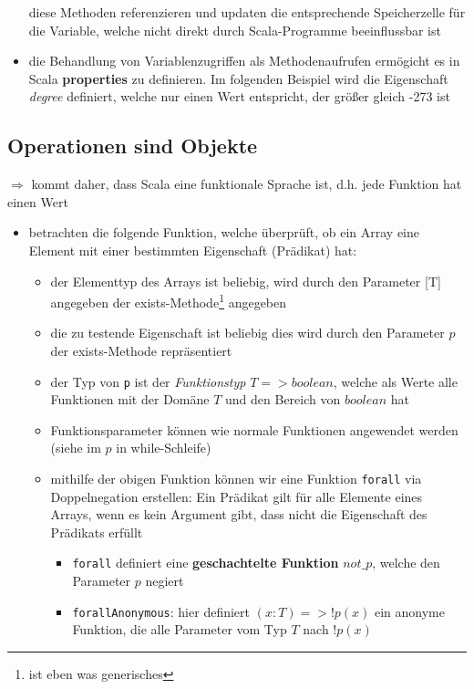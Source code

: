\begin{itemize}
  
  
  diese Methoden referenzieren und updaten die entsprechende Speicherzelle für
  die Variable, welche nicht direkt durch Scala-Programme beeinflussbar ist
  
  \item die Behandlung von Variablenzugriffen als Methodenaufrufen ermögicht
  es in Scala \textbf{properties} zu definieren. Im folgenden Beispiel wird
  die Eigenschaft \textit{degree} definiert, welche nur einen Wert entspricht,
  der größer \oder gleich -273 ist
  
  
  
\end{itemize}


\subsection{Operationen sind Objekte}
$\Rightarrow$ kommt daher, dass Scala eine funktionale Sprache ist, d.h. 
jede Funktion hat einen Wert




\begin{itemize}
  \item betrachten die folgende Funktion, welche überprüft, ob ein Array eine
  Element mit einer bestimmten Eigenschaft (Prädikat) hat:
  
  
  
  \begin{itemize}
    \item der Elementtyp des Arrays ist beliebig, wird durch den Parameter [T]
    angegeben der exists-Methode\footnote{ist eben was generisches} angegeben 
    \item die zu testende Eigenschaft ist beliebig \und dies wird durch
    den Parameter $p$ der exists-Methode repräsentiert
    \item der Typ von \texttt{p} ist der \textit{Funktionstyp} $T => boolean$,
    welche als Werte alle Funktionen mit der Domäne $T$ und den Bereich von
    $boolean$ hat
    \item Funktionsparameter können wie normale Funktionen angewendet werden 
    (siehe im $p$ in while-Schleife)
    \item mithilfe der obigen Funktion können wir eine Funktion \texttt{forall}
  via Doppelnegation erstellen: Ein Prädikat gilt für alle Elemente eines Arrays,
  wenn es kein Argument gibt, dass nicht die Eigenschaft des Prädikats erfüllt
    \begin{itemize}
      \item \texttt{forall} definiert eine \textbf{geschachtelte Funktion} 
      $not\_p$, welche den Parameter $p$ negiert
      \item \texttt{forallAnonymous}: hier definiert $(x: T) => !p(x)$
      ein anonyme Funktion, die alle Parameter vom Typ $T$ nach $!p(x)$
    \end{itemize}
  \end{itemize}
\end{itemize}


